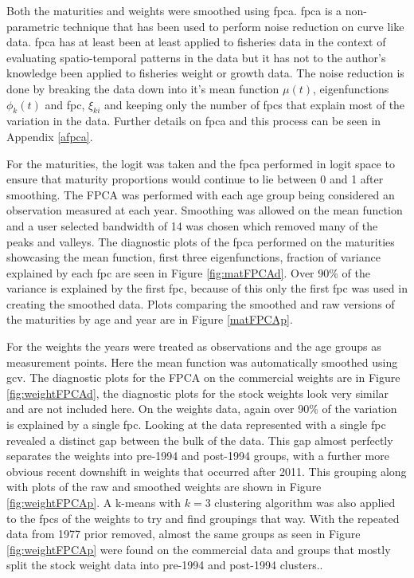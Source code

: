 \documentclass[11pt]{article}\usepackage[]{graphicx}\usepackage[]{color}
\begin{document}
 Both the maturities and weights were smoothed using \acrfull{fpca}. \acrshort{fpca} is a non-parametric technique that has been used to perform noise reduction on curve like data\cite{ramsay2007applied}. \acrshort{fpca} has at least been at least applied to fisheries data in the context of evaluating spatio-temporal patterns in the data\cite{embling_2012} but it has not to the author's knowledge been applied to fisheries weight or growth data. The noise reduction is done by breaking the data down into it's mean function $\mu(t)$, eigenfunctions $\phi_k(t)$ and \acrfull{fpc}, $\xi_{ki}$ and keeping only the number of \acrshort{fpc}s that explain most of the variation in the data.  Further details on \acrshort{fpca} and this process can be seen in Appendix \ref{afpca}.



For the maturities, the logit was taken and the \acrshort{fpca} performed in logit space to ensure that maturity proportions would continue to lie between 0 and 1 after smoothing. The FPCA was performed with each age group being considered an observation measured at each year. Smoothing was allowed on the mean function and a user selected bandwidth of 14 was chosen which removed many of the peaks and valleys. The diagnostic plots of the \acrshort{fpca} performed on the maturities showcasing the mean function, first three eigenfunctions, fraction of variance explained by each \acrshort{fpc} are seen in Figure \ref{fig:matFPCAd}. Over 90\% of the variance is explained by the first \acrshort{fpc}, because of this only the first \acrshort{fpc} was used in creating the smoothed data. Plots comparing the smoothed and raw versions of the maturities by age and year are in Figure \ref{matFPCAp}.

For the weights the years were treated as observations and the age groups as measurement points. Here the mean function was automatically smoothed using \acrfull{gcv}. The diagnostic plots for the FPCA on the commercial weights are in Figure \ref{fig:weightFPCAd}, the diagnostic plots for the stock weights look very similar and are not included here. On the weights data, again over 90\% of the variation is explained by a single \acrshort{fpc}. Looking at the data represented with a single \acrshort{fpc} revealed a distinct gap between the bulk of the data. This gap almost perfectly separates the weights into pre-1994 and post-1994 groups, with a further more obvious recent downshift in weights that occurred after 2011. This grouping along with plots of the raw and smoothed weights are shown in Figure \ref{fig:weightFPCAp}. A k-means with $k=3$ clustering algorithm was also applied to the \acrshort{fpc}s of the weights to try and find groupings that way. With the repeated data from 1977 prior removed, almost the same groups as seen in Figure \ref{fig:weightFPCAp} were found on the commercial data and groups that mostly split the stock weight data into pre-1994 and post-1994 clusters..
\end{document}
